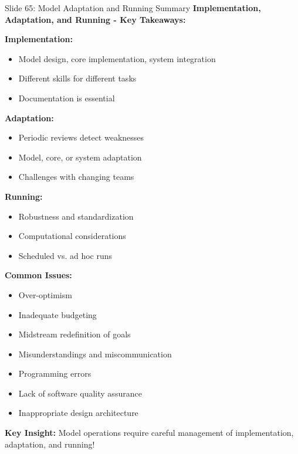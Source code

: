 \documentclass[8pt]{beamer}
\begin{document}
	\begin{frame}{Slide 65: Model Adaptation and Running Summary}
		\fontsize{6.5}{7.5}\selectfont
		\textbf{Implementation, Adaptation, and Running - Key Takeaways:}
		
		\vspace{0.1cm}
		\textbf{Implementation:}
		\begin{itemize}
			\item Model design, core implementation, system integration
			\item Different skills for different tasks
			\item Documentation is essential
		\end{itemize}
		
		\vspace{0.1cm}
		\textbf{Adaptation:}
		\begin{itemize}
			\item Periodic reviews detect weaknesses
			\item Model, core, or system adaptation
			\item Challenges with changing teams
		\end{itemize}
		
		\vspace{0.1cm}
		\textbf{Running:}
		\begin{itemize}
			\item Robustness and standardization
			\item Computational considerations
			\item Scheduled vs. ad hoc runs
		\end{itemize}
		
		\vspace{0.1cm}
		\textbf{Common Issues:}
		\begin{itemize}
			\item Over-optimism
			\item Inadequate budgeting
			\item Midstream redefinition of goals
			\item Misunderstandings and miscommunication
			\item Programming errors
			\item Lack of software quality assurance
			\item Inappropriate design architecture
		\end{itemize}
		
		\textcolor{myblue}{\textbf{Key Insight:}} Model operations require \textcolor{myblue}{careful management of implementation, adaptation, and running}!
	\end{frame}
	
\end{document}
